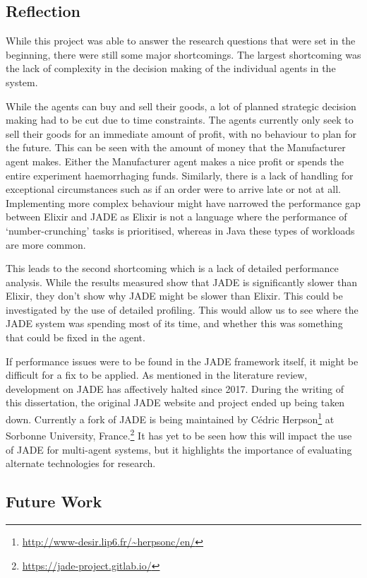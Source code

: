 \subsection{Reflection}

While this project was able to answer the research questions that were set in the beginning, there were still some major shortcomings.
The largest shortcoming was the lack of complexity in the decision making of the individual agents in the system.

While the agents can buy and sell their goods, a lot of planned strategic decision making had to be cut due to time constraints.
The agents currently only seek to sell their goods for an immediate amount of profit, with no behaviour to plan for the future.
This can be seen with the amount of money that the Manufacturer agent makes.
Either the Manufacturer agent makes a nice profit or spends the entire experiment haemorrhaging funds.
Similarly, there is a lack of handling for exceptional circumstances such as if an order were to arrive late or not at all.
Implementing more complex behaviour might have narrowed the performance gap between Elixir and JADE as Elixir is not a language where the performance of `number-crunching' tasks is prioritised, whereas in Java these types of workloads are more common.

This leads to the second shortcoming which is a lack of detailed performance analysis.
While the results measured show that JADE is significantly slower than Elixir, they don't show why JADE might be slower than Elixir.
This could be investigated by the use of detailed profiling.
This would allow us to see where the JADE system was spending most of its time, and whether this was something that could be fixed in the agent.

If performance issues were to be found in the JADE framework itself, it might be difficult for a fix to be applied.
As mentioned in the literature review, development on JADE has affectively halted since 2017.
During the writing of this dissertation, the original JADE website and project ended up being taken down.
Currently a fork of JADE is being maintained by C\'edric Herpson\footnote{\url{http://www-desir.lip6.fr/~herpsonc/en/}} at Sorbonne University, France.\footnote{\url{https://jade-project.gitlab.io/}}
It has yet to be seen how this will impact the use of JADE for multi-agent systems, but it highlights the importance of evaluating alternate technologies for research.

\subsection{Future Work}

